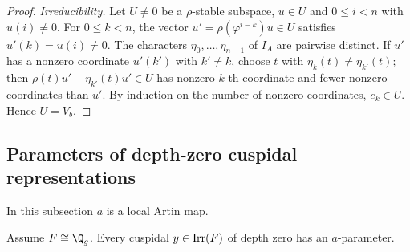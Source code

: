\begin{proof}
\emph{Irreducibility.} Let $U\neq0$ be a $\rho$-stable subspace, $u\in U$ and $0\le i<n$ with $u(i)\ne0$. For
$0\le k<n$, the vector $u'=\rho(\varphi^{i-k})u\in U$ satisfies $u'(k)=u(i)\ne0$. The characters $\eta_0,\dots,\eta_{n-1}$
of $I_A$ are pairwise distinct. If $u'$ has a nonzero coordinate $u'(k')$ with $k'\ne k$, choose $t$ with
$\eta_k(t)\neq\eta_{k'}(t)$; then $\rho(t)u'-\eta_{k'}(t)u'\in U$ has nonzero $k$-th coordinate and fewer nonzero
coordinates than $u'$. By induction on the number of nonzero coordinates, $e_k\in U$. Hence $U=V_b$.
\end{proof}

\subsection{Parameters of depth-zero cuspidal representations}\label{pf:llc:sec-par}

In this subsection $a$ is a local Artin map.

\begin{proposition}\label{pf:llc:parex}
Assume $F\cong\Q_g$. Every cuspidal $y\in\operatorname{Irr}(F)$ of depth zero has an $a$-parameter.
\end{proposition}

